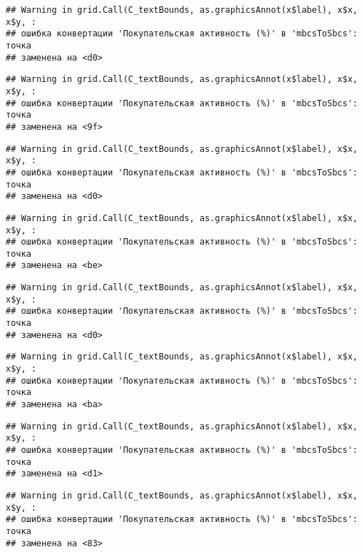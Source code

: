 \documentclass[
]{article}
\begin{document}
\begin{verbatim}
## Warning in grid.Call(C_textBounds, as.graphicsAnnot(x$label), x$x, x$y, :
## ошибка конвертации 'Покупательская активность (%)' в 'mbcsToSbcs': точка
## заменена на <d0>
\end{verbatim}

\begin{verbatim}
## Warning in grid.Call(C_textBounds, as.graphicsAnnot(x$label), x$x, x$y, :
## ошибка конвертации 'Покупательская активность (%)' в 'mbcsToSbcs': точка
## заменена на <9f>
\end{verbatim}

\begin{verbatim}
## Warning in grid.Call(C_textBounds, as.graphicsAnnot(x$label), x$x, x$y, :
## ошибка конвертации 'Покупательская активность (%)' в 'mbcsToSbcs': точка
## заменена на <d0>
\end{verbatim}

\begin{verbatim}
## Warning in grid.Call(C_textBounds, as.graphicsAnnot(x$label), x$x, x$y, :
## ошибка конвертации 'Покупательская активность (%)' в 'mbcsToSbcs': точка
## заменена на <be>
\end{verbatim}

\begin{verbatim}
## Warning in grid.Call(C_textBounds, as.graphicsAnnot(x$label), x$x, x$y, :
## ошибка конвертации 'Покупательская активность (%)' в 'mbcsToSbcs': точка
## заменена на <d0>
\end{verbatim}

\begin{verbatim}
## Warning in grid.Call(C_textBounds, as.graphicsAnnot(x$label), x$x, x$y, :
## ошибка конвертации 'Покупательская активность (%)' в 'mbcsToSbcs': точка
## заменена на <ba>
\end{verbatim}

\begin{verbatim}
## Warning in grid.Call(C_textBounds, as.graphicsAnnot(x$label), x$x, x$y, :
## ошибка конвертации 'Покупательская активность (%)' в 'mbcsToSbcs': точка
## заменена на <d1>
\end{verbatim}

\begin{verbatim}
## Warning in grid.Call(C_textBounds, as.graphicsAnnot(x$label), x$x, x$y, :
## ошибка конвертации 'Покупательская активность (%)' в 'mbcsToSbcs': точка
## заменена на <83>
\end{verbatim}
\end{document}
